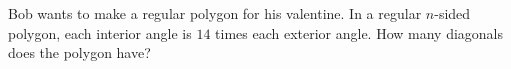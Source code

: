 Bob wants to make a regular polygon for his valentine. In a regular $n$-sided polygon, each interior angle is $14$ times each exterior angle. How many diagonals does the polygon have?
